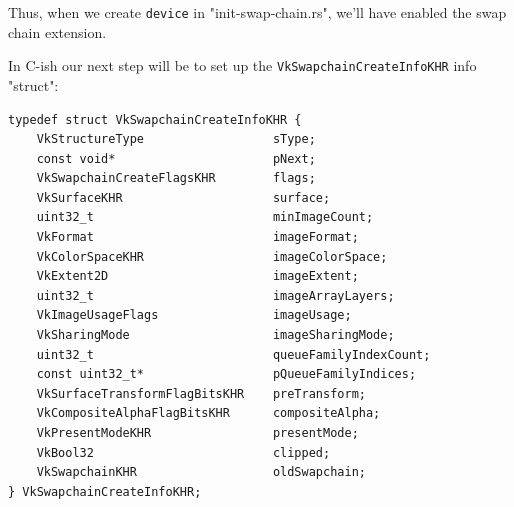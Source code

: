 \documentclass[12pt,letterpaper]{article}
\newcommand{\ril}[1]{\texttt{#1}}
\newcommand{\cil}[1]{\texttt{#1}}
\begin{document}
	Thus, when we create \ril{device} in "init-swap-chain.rs", we'll have enabled the swap chain extension. 
	
	In C-ish our next step will be to set up the \cil{VkSwapchainCreateInfoKHR} info "struct":
\begin{verbatim}
typedef struct VkSwapchainCreateInfoKHR {
	VkStructureType                  sType;
	const void*                      pNext;
	VkSwapchainCreateFlagsKHR        flags;
	VkSurfaceKHR                     surface;
	uint32_t                         minImageCount;
	VkFormat                         imageFormat;
	VkColorSpaceKHR                  imageColorSpace;
	VkExtent2D                       imageExtent;
	uint32_t                         imageArrayLayers;
	VkImageUsageFlags                imageUsage;
	VkSharingMode                    imageSharingMode;
	uint32_t                         queueFamilyIndexCount;
	const uint32_t*                  pQueueFamilyIndices;
	VkSurfaceTransformFlagBitsKHR    preTransform;
	VkCompositeAlphaFlagBitsKHR      compositeAlpha;
	VkPresentModeKHR                 presentMode;
	VkBool32                         clipped;
	VkSwapchainKHR                   oldSwapchain;
} VkSwapchainCreateInfoKHR;
\end{verbatim}
\end{document}
